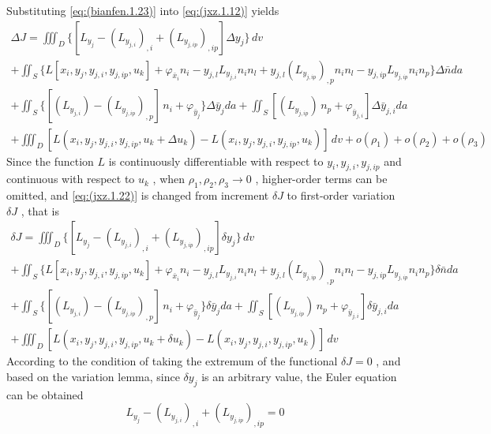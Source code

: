 Substituting \ref{eq:(bianfen.1.23)} into \ref{eq:(jxz.1.12)} yields
\begin{multline} \label{eq:(jxz.1.22)}    
\Delta J = \iiint_D \{[L_{y_j} - \left(L_{y_{j,i}}\right)_{,i}+\left(L_{y_{j,ip}}\right)_{, ip}]\Delta y_j \}\,dv 
\\+\iint_S \{L[x_i,y_j,y_{j,i},y_{j,ip},u_k]+ \varphi_{\bar {x}_i } n_i 
-y_{j,l} L_{y_{j,i}} n_i n_l   + y_{j,l} \left(L_{y_{j,ip}}\right)_{,p} n_i n_l 
-y_{j,ip} L_{y_{j,ip}} n_i  n_p \}\Delta \bar{n} da
\\+\iint_S \{[\left(L_{y_{j,i}}  \right) -\left(L_{y_{j,ip}}\right)_{,p}]\,n_i + \varphi_{\bar {y}_j } \}\Delta \bar{y} _j da
+\iint_S [\left(L_{y_{j,ip}}  \right)\,n_p +\varphi_{\bar {y}_ {j,i}}] \Delta \bar {y}_ {j,i} da
\\+\iiint_D [L(x_i,y_j,y_{j,i},y_{j,ip},u_k+\Delta u_k)-L(x_i,y_j,y_{j,i},y_{j,ip},u_k)] \,dv+o(\rho_1)+o(\rho_2)+o(\rho_3)
\end{multline} 
Since the function $ L$  is continuously differentiable with respect to $ y_i, y_ {j, i}, y_ {j, ip}$  and continuous with respect to $ u_k $ , when $ \rho_1, \rho_2, \rho_3 \to 0 $ , higher-order terms can be omitted, and \ref{eq:(jxz.1.22)} is changed from increment $ \delta J $ to first-order variation $ \delta J $ , that is
\begin{multline} \label{eq:(jxz.1.23)}    
\delta J = \iiint_D \{[L_{y_j} - \left(L_{y_{j,i}}\right)_{,i}+\left(L_{y_{j,ip}}\right)_{, ip}]\delta y_j \}\,dv 
\\+\iint_S \{L[x_i,y_j,y_{j,i},y_{j,ip},u_k]+ \varphi_{\bar {x}_i } n_i 
-y_{j,l} L_{y_{j,i}} n_i n_l   + y_{j,l} \left(L_{y_{j,ip}}\right)_{,p} n_i n_l 
-y_{j,ip} L_{y_{j,ip}} n_i  n_p \}\delta \bar{n} da
\\+\iint_S \{[\left(L_{y_{j,i}}  \right) -\left(L_{y_{j,ip}}\right)_{,p}]\,n_i + \varphi_{\bar {y}_j } \}\delta \bar{y} _j da
+\iint_S [\left(L_{y_{j,ip}}  \right)\,n_p +\varphi_{\bar {y}_ {j,i}}] \delta \bar {y}_ {j,i} da
\\+\iiint_D [L(x_i,y_j,y_{j,i},y_{j,ip},u_k+\delta u_k)-L(x_i,y_j,y_{j,i},y_{j,ip},u_k)] \,dv
\end{multline} 
According to the condition of taking the extremum of the functional $ \delta J=0 $ , and based on the variation lemma, since $ \delta y_j $ is an arbitrary value, the Euler equation can be obtained
\begin{equation} \label{eq:(jxz.1.24)}    
L_{y_j} - \left(L_{y_{j,i}}\right)_{,i}+\left(L_{y_{j,ip}}\right)_{,ip} =0
\end{equation}
